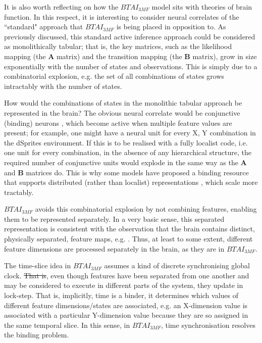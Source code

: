 \documentclass[twoside,11pt]{article}
\providecommand{\DIFadd}[1]{{\protect\color{blue}\uwave{#1}}} %
\providecommand{\DIFdel}[1]{{\protect\color{red}\sout{#1}}}                      %
\providecommand{\DIFaddbegin}{} %
\providecommand{\DIFaddend}{} %
\providecommand{\DIFdelbegin}{} %
\providecommand{\DIFdelend}{} %
\begin{document}
It is also worth reflecting on how the $BTAI_{3MF}$ model sits with theories of brain function. In this respect, it is interesting to consider neural correlates of the ``standard" approach that $BTAI_{3MF}$ is being placed in opposition to. As previously discussed, this standard active inference approach could be considered as monolithically tabular; that is, the key matrices, such as the likelihood mapping (the $\bm{A}$ matrix) and the transition mapping (the $\bm{B}$ matrix), grow in size exponentially with the number of states and observations. This is simply due to a combinatorial explosion, e.g. the set of all combinations of states grows intractably with the number of states.

How would the combinations of states in the monolithic tabular approach be represented in the brain? The obvious neural correlate would be conjunctive (binding) neurons \citep{o2001conjunctive}, which become active when multiple feature values are present; for example, one might have a neural unit for every X, Y combination in the dSprites environment. If this is to be realised with a fully localist code, i.e. one unit for every combination, in the absence of any hierarchical structure, the required number of conjunctive units would explode in the same way as the $\bm{A}$ and $\bm{B}$ matrices do. This is why some models have proposed a binding resource that supports distributed (rather than localist) representations \citep{bowman2007simultaneous}, which scale more tractably.

$BTAI_{3MF}$ avoids this combinatorial explosion by not combining features, enabling them to be represented separately. In a very basic sense, this separated representation is consistent with the observation that the brain contains distinct, physically separated, feature maps, e.g. \citet{730558}. Thus, at least to some extent, different feature dimensions are processed separately in the brain, as they are in $BTAI_{3MF}$.

The time-slice idea in $BTAI_{3MF}$ assumes a kind of discrete synchronising global clock. \DIFdelbegin \DIFdel{That is}\DIFdelend \DIFaddbegin \DIFadd{Thus}\DIFaddend , even though features have been separated from one another and may be considered to execute in different parts of the system, they update in lock-step. That is, implicitly, time is a binder, it determines which values of different feature dimensions/states are associated, e.g. an X-dimension value is associated with a particular Y-dimension value because they are so assigned in the same temporal slice. In this sense, in $BTAI_{3MF}$, time synchronisation resolves the binding problem.
\end{document}
